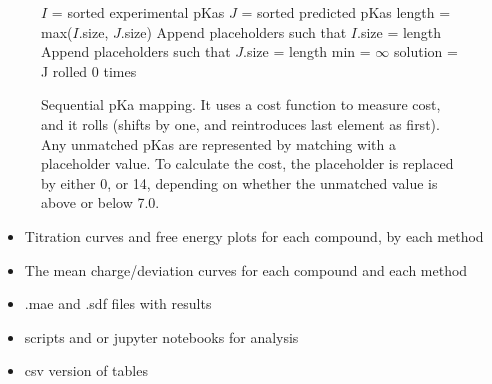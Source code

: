 \documentclass[9pt,lineno,final]{elife}
\begin{document}
\begin{figure}
	\begin{algorithm}[H]
		\SetAlgoLined
		\caption{Sequential pKa mapping. It uses a cost function to measure cost, and it rolls (shifts by one, and reintroduces last element as first). Any unmatched pKas are represented by matching with a placeholder value. To calculate the cost, the placeholder is replaced by either 0, or 14, depending on whether the unmatched value is above or below 7.0.}
		\label{alg:sequential}
		 
		$I$ = sorted experimental pKas \;
		$J$ = sorted predicted pKas \;
		length = max($I$.size, $J$.size)\;
		Append placeholders such that $I$.size = length \;
		Append placeholders such that $J$.size = length \;
		min = $\infty$\;
		solution = J rolled 0 times\;
	\end{algorithm}
\end{figure}

\begin{itemize}
	\item Titration curves and free energy plots for each compound, by each method
	\item The mean charge/deviation curves for each compound and each method
	\item .mae and .sdf files with results
	\item scripts and or jupyter notebooks for analysis
	\item csv version of tables
\end{itemize}
\end{document}
